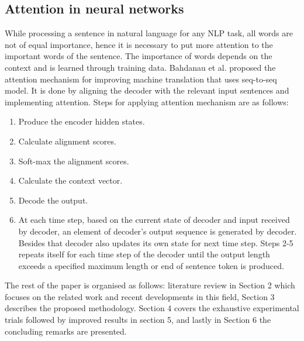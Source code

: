 \documentclass[runningheads]{llncs}
\begin{document}
\subsection{Attention in neural networks}
While processing a sentence in natural language for any NLP task, all words are not of equal importance, hence it is necessary to put more attention to the important words of the sentence. The importance of words depends on the context and is learned through training data. Bahdanau et al. \cite{bahdanau2014neural} proposed the attention mechanism for improving machine translation that uses seq-to-seq model. It is done by aligning the decoder with the relevant input sentences and implementing attention. Steps for applying attention mechanism are as follows:
\begin{enumerate}[label= \arabic*]
\item Produce the encoder hidden states.
\item Calculate alignment scores.
\item Soft-max the alignment scores.
\item Calculate the context vector.
\item Decode the output.
\item At each time step, based on the current state of decoder and input received by decoder, an element of decoder's output sequence is generated by decoder. Besides that decoder also updates its own state for next time step. Steps 2-5 repeats itself for each time step of the decoder until the output length exceeds a specified maximum length or end of sentence token is produced.
\end{enumerate}

The rest of the paper is organised as follows: literature review in Section 2 which focuses on the related work and recent developments in this field, Section 3 describes the proposed methodology. Section 4 covers the exhaustive experimental trials followed by improved results in section 5, and lastly in Section 6 the concluding remarks are presented.
\end{document}
